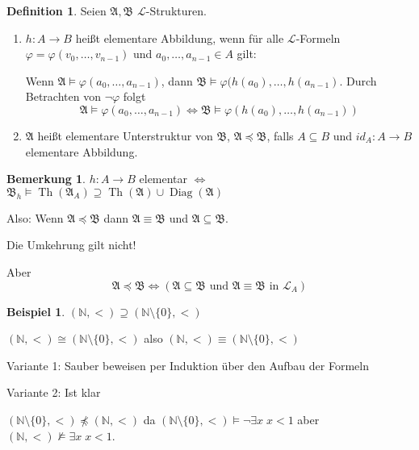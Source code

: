 \documentclass[12pt,parskip=full]{scrartcl}
\newcommand{\setN}{\mathbb{N}}
\theoremstyle{definition}
\newtheorem{definition}[theorem]{Definition}
\newtheorem{example}[theorem]{Beispiel}
\newtheorem{remark}[theorem]{Bemerkung}
\begin{document}
	\begin{definition}
		Seien $\mathfrak{A}, \mathfrak{B}$ $\mathcal{L}$-Strukturen. \begin{enumerate}
			\item $h: A \to B$ heißt elementare Abbildung, wenn für alle $\mathcal{L}$-Formeln $\varphi = \varphi(v_0, \dots, v_{n-1})$ und $a_0, \dots, a_{n-1} \in A$ gilt:
			
			Wenn $\mathfrak{A} \models \varphi(a_0, \dots, a_{n-1})$, dann $\mathfrak{B} \models \varphi(h(a_0), \dots, h(a_{n-1})$. Durch Betrachten von $\lnot \varphi$ folgt
			\begin{equation*}
				\mathfrak{A} \models \varphi(a_0, \dots, a_{n-1}) \Leftrightarrow \mathfrak{B} \models \varphi(h(a_0), \dots, h(a_{n-1}))
			\end{equation*}
			\item $\mathfrak{A}$ heißt elementare Unterstruktur von $\mathfrak{B}$, $\mathfrak{A} \preccurlyeq \mathfrak{B}$, falls $A \subseteq B$ und $id_A: A \to B$ elementare Abbildung.
		\end{enumerate}
	\end{definition}

	\begin{remark}
		$h: A \to B$ elementar $\Leftrightarrow$ $\mathfrak{B}_h \models \operatorname{Th}(\mathfrak{A}_A) \supseteq \operatorname{Th}(\mathfrak{A}) \cup \operatorname{Diag}(\mathfrak{A})$
		
		Also: Wenn $\mathfrak{A} \preccurlyeq \mathfrak{B}$ dann $\mathfrak{A} \equiv \mathfrak{B}$ und $\mathfrak{A} \subseteq \mathfrak{B}$.
		
		Die Umkehrung gilt nicht!
		
		Aber
		\begin{equation*}
			\mathfrak{A} \preccurlyeq \mathfrak{B} \Leftrightarrow (\mathfrak{A} \subseteq \mathfrak{B} \text{ und } \mathfrak{A} \equiv \mathfrak{B} \text{ in } \mathcal{L}_A)
		\end{equation*}
	\end{remark}

	\begin{example}
		$(\setN, <) \supseteq (\setN \setminus \{ 0 \}, <)$
		
		$(\setN, <) \cong (\setN \setminus \{ 0 \}, <)$ also $(\setN, <) \equiv (\setN \setminus \{ 0 \}, <)$
		
		Variante 1: Sauber beweisen per Induktion über den Aufbau der Formeln
		
		Variante 2: Ist klar
		
		$(\setN \setminus \{ 0 \}, <) \npreceq (\setN, <)$ da $(\setN \setminus \{ 0 \}, <) \models \lnot \exists x \; x < 1$ aber $(\setN, <) \not\models \exists x \; x < 1$.
	\end{example}
\end{document}
